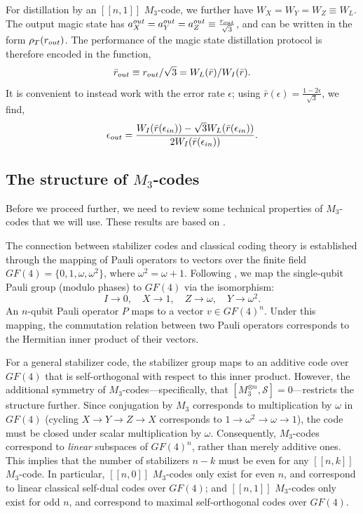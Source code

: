 \documentclass[11pt]{article}
\begin{document}
For distillation by an $[[n,1]]$ $M_3$-code, we further have $W_X=W_Y=W_Z \equiv W_L$. The output magic state has ${a}^{\rm out}_X={a}^{\rm out}_Y={a}^{\rm out}_Z \equiv \frac{r_{\rm out}}{\sqrt{3}}$, and can be written in the form $\rho_T(r_{\rm out})$. The performance of the magic state distillation protocol is therefore encoded in the function, 
\begin{equation}
    \bar{r}_{\rm out}\equiv r_{\rm out}/\sqrt{3} = W_L(\bar{r})/W_I(\bar{r}). \label{r-msd}
\end{equation}
It is convenient to instead work with the error rate $\epsilon$; using $\bar{r}(\epsilon)=\frac{1-2\epsilon}{\sqrt{3}}$, we find,
\begin{equation}
    \epsilon_{\rm out} = \frac{W_I(\bar r(\epsilon_{\rm in}))-\sqrt{3} W_L(\bar r(\epsilon_{\rm in}))}{2 W_I(\bar r(\epsilon_{\rm in}))}. \label{epsilon-msd}
\end{equation}
\subsection{The structure of $M_3$-codes}
\label{sec:M3-codes}
Before we proceed further, we need to review some technical properties of $M_3$-codes that we will use. These results are based on \cite{macwilliams1978self, calderbank1998quantum, MSD, rall2017signed}.

The connection between stabilizer codes and classical coding theory is established through the mapping of Pauli operators to vectors over the finite field $GF(4) = \{0, 1, \omega, \omega^2\}$, where $\omega^2 = \omega + 1$. Following \cite{calderbank1998quantum}, we map the single-qubit Pauli group (modulo phases) to $GF(4)$ via the isomorphism:
\begin{equation}
    I \to 0, \quad X \to 1, \quad Z \to \omega, \quad Y \to \omega^2.
\end{equation}
An $n$-qubit Pauli operator $P$ maps to a vector $v \in GF(4)^n$. Under this mapping, the commutation relation between two Pauli operators corresponds to the Hermitian inner product of their vectors.

For a general stabilizer code, the stabilizer group maps to an additive code over $GF(4)$ that is self-orthogonal with respect to this inner product. However, the additional symmetry of $M_3$-codes—specifically, that $[M_3^{\otimes n}, \mathcal{S}] = 0$—restricts the structure further. Since conjugation by $M_3$ corresponds to multiplication by $\omega$ in $GF(4)$ (cycling $X \to Y \to Z \to X$ corresponds to $1 \to \omega^2 \to \omega \to 1$), the code must be closed under scalar multiplication by $\omega$. Consequently, $M_3$-codes correspond to \textit{linear} subspaces of $GF(4)^n$, rather than merely additive ones. This implies that the number of stabilizers $n-k$ must be even for any $[[n,k]]$ $M_3$-code. In particular, $[[n,0]]$ $M_3$-codes only exist for even $n$, and correspond to linear classical self-dual codes over $GF(4)$; and $[[n,1]]$ $M_3$-codes only exist for odd $n$, and correspond to maximal self-orthogonal codes over $GF(4)$. 
\end{document}
